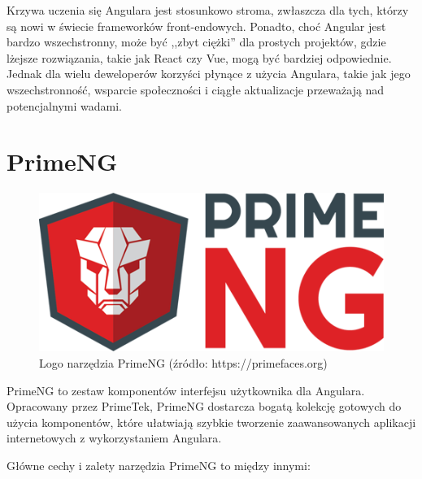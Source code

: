Krzywa uczenia się Angulara jest stosunkowo stroma, zwłaszcza dla tych, którzy są nowi w świecie frameworków front-endowych. Ponadto, choć Angular jest bardzo wszechstronny, może być ,,zbyt ciężki'' dla prostych projektów, gdzie lżejsze rozwiązania, takie jak React czy Vue, mogą być bardziej odpowiednie. Jednak dla wielu deweloperów korzyści płynące z użycia Angulara, takie jak jego wszechstronność, wsparcie społeczności i ciągłe aktualizacje przeważają nad potencjalnymi wadami\cite{angularSpecs}.

\section{PrimeNG}
\begin{figure}[h]
    \centering
    \includegraphics[width=0.5\linewidth]{./img/primeng.png}
    \caption{Logo narzędzia PrimeNG (źródło: https://primefaces.org)}
    \label{fig:PrimeNG}
\end{figure}

PrimeNG to zestaw komponentów interfejsu użytkownika dla Angulara. Opracowany przez PrimeTek, PrimeNG dostarcza bogatą kolekcję gotowych do użycia komponentów, które ułatwiają szybkie tworzenie zaawansowanych aplikacji internetowych z wykorzystaniem Angulara.

Główne cechy i zalety narzędzia PrimeNG to między innymi:

